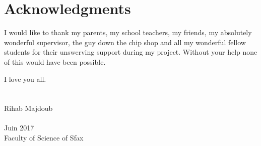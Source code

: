 \cleardoublepage
{}
{}
\section*{Acknowledgments}
\vspace{1.0in}
I would like to thank my parents, my school teachers, my friends, my
absolutely wonderful supervisor, the guy down the chip shop and all
my wonderful fellow students for their unswerving support during my
project. Without your help none of this would have been possible.

I love you all.
\\
\\
\\
Rihab Majdoub
\\
\\
Juin 2017
\\
Faculty of Science of Sfax
